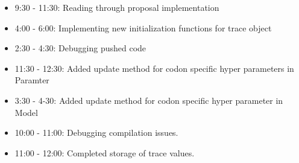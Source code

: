 \documentclass[12pt,hyperref]{labbook}
\begin{document}
\begin{itemize}
    \item 9:30 - 11:30: Reading through proposal implementation
\end{itemize}
\begin{itemize}
    \item 4:00 - 6:00: Implementing new initialization functions for trace object
\end{itemize}
\begin{itemize}
    \item 2:30 - 4:30: Debugging pushed code
\end{itemize}
\begin{itemize}
    \item 11:30 - 12:30: Added update method for codon specific 
        hyper parameters in Paramter
    \item 3:30 - 4-30: Added update method for codon specific hyper 
        parameter in Model
\end{itemize}
\begin{itemize}
 \item 10:00 - 11:00: Debugging compilation issues.
 \item 11:00 - 12:00: Completed storage of trace values.
\end{itemize}
\end{document}
